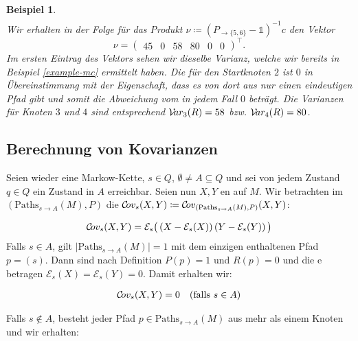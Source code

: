 \documentclass[a4paper]{article}
\newcommand{\mc}{Markow-Kette}
\newtheorem{beispiel}[satz]{Beispiel}
\theoremstyle{nonumberplain}
\begin{document}
\begin{beispiel}
\begin{align*}
		\end{align*}
		Wir erhalten in der Folge für das Produkt $\nu \coloneqq (P_{\rightarrow \{5,6\}} - \mathbb{1})^{-1}c$ den Vektor
		\begin{equation*}
		\nu = \begin{pmatrix} 45 & 0 & 58 & 80 & 0 & 0 \end{pmatrix}^\intercal\text{.}
		\end{equation*}
		Im ersten Eintrag des Vektors sehen wir dieselbe Varianz, welche wir bereits in Beispiel \ref{example-mc} ermittelt haben. Die \var{} für den Startknoten $2$ ist $0$ in Übereinstimmung mit der Eigenschaft, dass es von dort aus nur einen eindeutigen Pfad gibt und somit die Abweichung vom \expect{} in jedem Fall $0$ beträgt. Die Varianzen für Knoten $3$ und $4$ sind entsprechend $\mathcal{V}\!ar_3(R) = 58$ bzw. $\mathcal{V}\!ar_4(R) = 80$.
		
	\end{beispiel}
	
	\subsection{Berechnung von Kovarianzen}
	
	Seien wieder \mcex{} eine \mc{}, $s \in Q$, $\emptyset \neq A \subseteq Q$ und sei von jedem Zustand $q\in Q$ ein Zustand in $A$ erreichbar. Seien nun $X, Y$ \reward{}en auf $M$. Wir betrachten im \probspacen{} $(\mathrm{Paths}_{s \rightarrow A}(M), P)$ die \cov{} $\mathcal{C}\!ov_s(X,Y) \coloneqq \mathcal{C}\!ov_{(\mathrm{Paths}_{s \rightarrow A}(M), P)}(X,Y)$:
	
	\begin{equation}
	\mathcal{C}\!ov_{s}(X,Y) = \mathcal{E}_{s}\big(\left(X - \mathcal{E}_{s} (X)\right)\left(Y - \mathcal{E}_{s} (Y)\right)\big)
	\end{equation}
	Falls $s \in A$, gilt $|\mathrm{Paths}_{s \rightarrow A}(M)| = 1$ mit dem einzigen enthaltenen Pfad $p = (s)$. Dann sind nach Definition $P(p) = 1$ und $R(p) = 0$ und die \expect{}e betragen $\mathcal{E}_{s}(X) = \mathcal{E}_{s}(Y) = 0$. Damit erhalten wir:
	
	\begin{align}
	\mathcal{C}\!ov_{s}(X,Y) = 0 && \text{(falls $s \in A$)}\label{cov_trivial}
	\end{align}
	
	Falls $s \notin A$, besteht jeder Pfad $p \in \mathrm{Paths}_{s \rightarrow A}(M)$ aus mehr als einem Knoten und wir erhalten:
	
\end{document}
